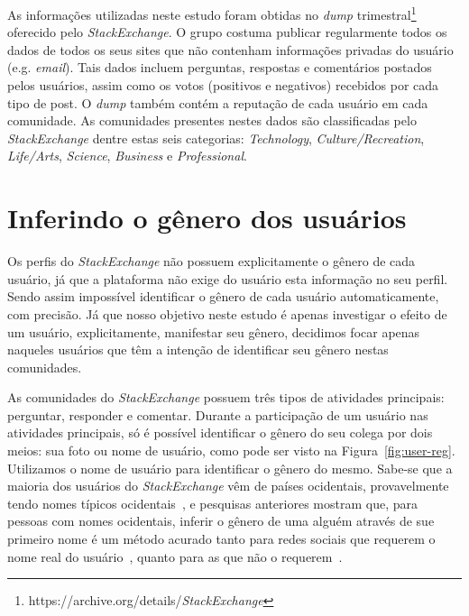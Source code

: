 As informações utilizadas neste estudo foram obtidas no \emph{dump} trimestral\footnote{https://archive.org/details/\emph{StackExchange}} oferecido pelo \emph{StackExchange}. O grupo costuma publicar regularmente todos os dados de todos os seus sites que não contenham informações privadas do usuário (e.g. \emph{email}). Tais dados incluem perguntas, respostas e comentários postados pelos usuários, assim como os votos (positivos e negativos) recebidos por cada tipo de post. O \emph{dump} também contém a reputação de cada usuário em cada comunidade. As comunidades presentes nestes dados são classificadas pelo \emph{StackExchange} dentre estas seis categorias: \emph{Technology}, \emph{Culture/Recreation}, \emph{Life/Arts}, \emph{Science}, \emph{Business} e \emph{Professional}.

\section{Inferindo o gênero dos usuários}

Os perfis do \emph{StackExchange} não possuem explicitamente o gênero de cada usuário, já que a plataforma não exige do usuário esta informação no seu perfil. Sendo assim impossível identificar o gênero de cada usuário automaticamente, com precisão. Já que nosso objetivo neste estudo é apenas investigar o efeito de um usuário, explicitamente, manifestar seu gênero, decidimos focar apenas naqueles usuários que têm a intenção de identificar seu gênero nestas comunidades.

As comunidades do \emph{StackExchange} possuem três tipos de atividades principais: perguntar, responder e comentar. Durante a participação de um usuário nas atividades principais, só é possível identificar o gênero do seu colega por dois meios: sua foto ou nome de usuário, como pode ser visto na Figura~\ref{fig:user-reg}. Utilizamos o nome de usuário para identificar o gênero do mesmo. Sabe-se que a maioria dos usuários do \emph{StackExchange} vêm de países ocidentais, provavelmente tendo nomes típicos ocidentais~\cite{schenk2013geo}, e pesquisas anteriores mostram que, para pessoas com nomes ocidentais, inferir o gênero de uma alguém através de sue primeiro nome é um método acurado tanto para redes sociais que requerem o nome real do usuário~\cite{tang2011s}, quanto para as que não o requerem~\cite{burger2011discriminating,liu2013s}.

